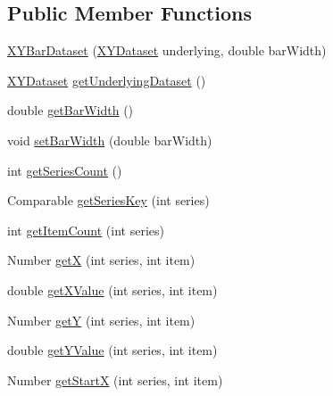 \subsection*{Public Member Functions}
\begin{DoxyCompactItemize}
\item 
\mbox{\hyperlink{classorg_1_1jfree_1_1data_1_1xy_1_1_x_y_bar_dataset_a590860d8caab84c3e67f5c0e14b4131d}{X\+Y\+Bar\+Dataset}} (\mbox{\hyperlink{interfaceorg_1_1jfree_1_1data_1_1xy_1_1_x_y_dataset}{X\+Y\+Dataset}} underlying, double bar\+Width)
\item 
\mbox{\hyperlink{interfaceorg_1_1jfree_1_1data_1_1xy_1_1_x_y_dataset}{X\+Y\+Dataset}} \mbox{\hyperlink{classorg_1_1jfree_1_1data_1_1xy_1_1_x_y_bar_dataset_a10a895a45474c8af19a794fd5908a197}{get\+Underlying\+Dataset}} ()
\item 
double \mbox{\hyperlink{classorg_1_1jfree_1_1data_1_1xy_1_1_x_y_bar_dataset_a6bc368e299939e55a2787aa3e48c618b}{get\+Bar\+Width}} ()
\item 
void \mbox{\hyperlink{classorg_1_1jfree_1_1data_1_1xy_1_1_x_y_bar_dataset_a866a70de4ee5b64b0a5da23ae4a140fa}{set\+Bar\+Width}} (double bar\+Width)
\item 
int \mbox{\hyperlink{classorg_1_1jfree_1_1data_1_1xy_1_1_x_y_bar_dataset_a36b782d7a1148715662e4f9443b5f73b}{get\+Series\+Count}} ()
\item 
Comparable \mbox{\hyperlink{classorg_1_1jfree_1_1data_1_1xy_1_1_x_y_bar_dataset_a313d8760b0a6d841a92fb8de7c193ce1}{get\+Series\+Key}} (int series)
\item 
int \mbox{\hyperlink{classorg_1_1jfree_1_1data_1_1xy_1_1_x_y_bar_dataset_a2dc0cb6c553d2957352f666e1ef69c8c}{get\+Item\+Count}} (int series)
\item 
Number \mbox{\hyperlink{classorg_1_1jfree_1_1data_1_1xy_1_1_x_y_bar_dataset_a517abc432ea872cbd470288b17725337}{getX}} (int series, int item)
\item 
double \mbox{\hyperlink{classorg_1_1jfree_1_1data_1_1xy_1_1_x_y_bar_dataset_a84dba23fe8e4a19faff04e32a4bc0ea3}{get\+X\+Value}} (int series, int item)
\item 
Number \mbox{\hyperlink{classorg_1_1jfree_1_1data_1_1xy_1_1_x_y_bar_dataset_a737db1e347fb9cb8b75179a54cf38287}{getY}} (int series, int item)
\item 
double \mbox{\hyperlink{classorg_1_1jfree_1_1data_1_1xy_1_1_x_y_bar_dataset_ad5f518543e018a6bc34cfe303bc9fa69}{get\+Y\+Value}} (int series, int item)
\item 
Number \mbox{\hyperlink{classorg_1_1jfree_1_1data_1_1xy_1_1_x_y_bar_dataset_a6d95616ddb06550818a901791ce17ec2}{get\+StartX}} (int series, int item)

\end{DoxyCompactItemize}
